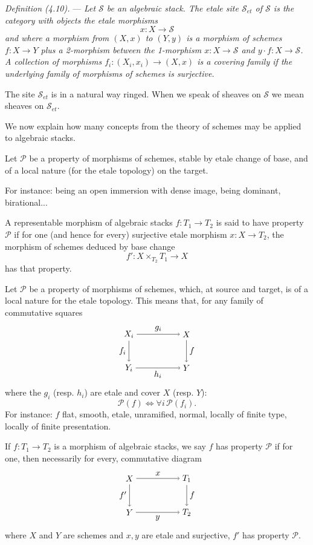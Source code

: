 \documentclass[10pt]{article}
\begin{document}
\medskip
\noindent\emph{Definition (4.10).} --- \emph{Let $\mathscr S$ be an algebraic stack. The etale site $\mathscr S_{et}$ of $\mathscr S$ is the category with objects the etale morphisms}
\[
x:X\to\mathscr S
\]
\emph{and where a morphism from $(X,x)$ to $(Y,y)$ is a morphism of schemes $f:X\to Y$ plus a 2-morphism between the 1-morphism $x:X\to\mathscr S$ and $y\cdot f:X\to\mathscr S$. A collection of morphisms $f_i:(X_i,x_i)\to(X,x)$ is a covering family if the underlying family of morphisms of schemes is surjective.}

The site $\mathscr S_{et}$ is in a natural way ringed. When we speak of sheaves on $\mathscr S$ we mean sheaves on $\mathscr S_{et}$.


We now explain how many concepts from the theory of schemes may be applied to algebraic stacks.

Let $\mathcal P$ be a property of morphisms of schemes, stable by etale change of base, and of a local nature (for the etale topology) on the target.

For instance: being an open immersion with dense image, being dominant, birational...

A representable morphism of algebraic stacks $f:T_1\to T_2$ is said to have property $\mathcal P$ if for one (and hence for every) surjective etale morphism $x:X\to T_2$, the morphism of schemes deduced by base change
\[
f':X\times_{T_2}T_1\longrightarrow X
\]
has that property.

Let $\mathcal P$ be a property of morphisms of schemes, which, at source and target, is of a local nature for the etale topology. This means that, for any family of commutative squares
\[
\begin{tikzpicture}[baseline=(current bounding box.center), node distance=1.6cm]
\node (Xi) at (0,1.4) {$X_i$};
\node (X) at (2.4,1.4) {$X$};
\node (Yi) at (0,0) {$Y_i$};
\node (Y) at (2.4,0) {$Y$};
\draw[->] (Xi) -- node[above] {$g_i$} (X);
\draw[->] (Xi) -- node[left] {$f_i$} (Yi);
\draw[->] (X) -- node[right] {$f$} (Y);
\draw[->] (Yi) -- node[below] {$h_i$} (Y);
\end{tikzpicture}
\]
where the $g_i$ (resp. $h_i$) are etale and cover $X$ (resp. $Y$):
\[
\mathcal P(f)\Longleftrightarrow \forall i\,\mathcal P(f_i).
\]
For instance: $f$ flat, smooth, etale, unramified, normal, locally of finite type, locally of finite presentation.

If $f:T_1\to T_2$ is a morphism of algebraic stacks, we say $f$ has property $\mathcal P$ if for one, then necessarily for every, commutative diagram
\[
\begin{tikzpicture}[baseline=(current bounding box.center)]
\node (X) at (0,1.4) {$X$};
\node (T1) at (2.4,1.4) {$T_1$};
\node (Y) at (0,0) {$Y$};
\node (T2) at (2.4,0) {$T_2$};
\draw[->] (X) -- node[above] {$x$} (T1);
\draw[->] (X) -- node[left] {$f'$} (Y);
\draw[->] (T1) -- node[right] {$f$} (T2);
\draw[->] (Y) -- node[below] {$y$} (T2);
\end{tikzpicture}
\]
where $X$ and $Y$ are schemes and $x,y$ are etale and surjective, $f'$ has property $\mathcal P$.
\end{document}
